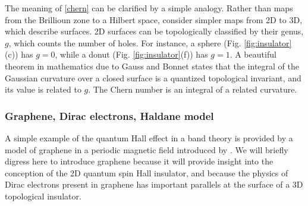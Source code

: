 \documentclass[twocolumn,floatfix,showpacs,rmp,aps]{revtex4}
\begin{document}
	
	
	
	The meaning of \eqref{chern} can be clarified by a simple analogy.  Rather than
	maps from the Brillioun zone to a Hilbert
	space, consider simpler maps from 2D to 3D, which describe surfaces.  2D surfaces can be
	topologically classified by their genus, $g$, which counts the number of
	holes.  For instance, a sphere (Fig. \ref{fig:insulator}(c)) has $g=0$,
	while a donut (Fig. \ref{fig:insulator}(f)) has $g=1$.
	A beautiful theorem in mathematics due to Gauss and Bonnet \cite{nakahara90} states
	that the integral of the Gaussian
	curvature over a closed surface is a quantized topological invariant, and
	its value is related to $g$.  The Chern number is an integral
	of a related curvature.
	
	
	\subsubsection{Graphene, Dirac electrons, Haldane model}
	\label{sec:dirac}
	
	A simple example of the quantum Hall effect in a band theory
	is provided by a  model of graphene in a
	periodic magnetic field introduced by \textcite{haldane88}.  We will briefly digress
	here to introduce graphene because it will provide insight into the conception of the
	2D quantum spin Hall insulator, and because the physics of Dirac electrons
	present in graphene has important parallels at the surface of a 3D topological insulator.
	
\end{document}
